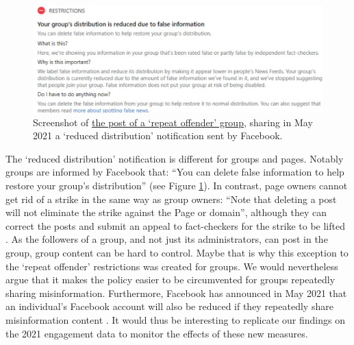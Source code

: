 \documentclass[review]{elsarticle}
\begin{document}
{{\begin{figure}[!h]
\centering
\includegraphics[scale=0.24]{./../figure/screenshot_reduced_group.png}
\caption{
Screenshot of \href{https://www.facebook.com/groups/mcbowwow/posts/3893068180741848/}{the post of a `repeat offender' group}, sharing in May 2021 a `reduced distribution' notification sent by Facebook.
}
\label{screenshot_reduced_group}
\end{figure}

The `reduced distribution' notification is different for groups and pages. 
Notably groups are informed by Facebook that: ``You can delete false information to help restore your group's distribution'' (see Figure \ref{screenshot_reduced_group}).
In contrast, page owners cannot get rid of a strike in the same way as group owners: ``Note that deleting a post will not eliminate the strike against the Page or domain'', although they can correct the posts and submit an appeal to fact-checkers for the strike to be lifted \cite{FacebookCorrectRating}.
As the followers of a group, and not just its administrators, can post in the group, group content can be hard to control. 
Maybe that is why this exception to the `repeat offender' restrictions was created for groups. 
We would nevertheless argue that it makes the policy easier to be circumvented for groups repeatedly sharing misinformation.
Furthermore, Facebook has announced in May 2021 that an individual's Facebook account will also be reduced if they repeatedly share misinformation content \cite{FacebookReduceUsers}.
It would thus be interesting to replicate our findings on the 2021 engagement data to monitor the effects of these new measures.

}}
\end{document}
